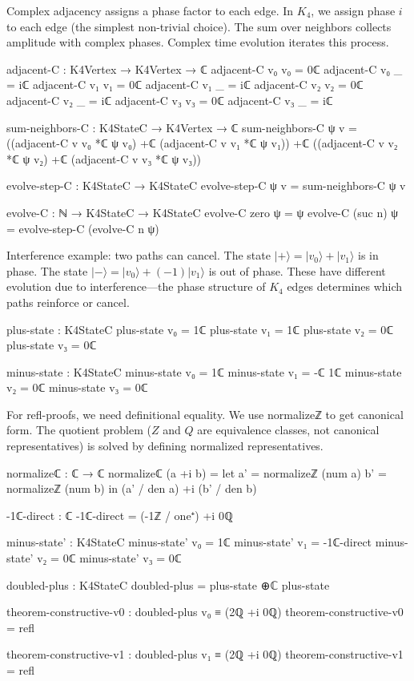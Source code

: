 \documentclass[11pt,a4paper]{book}
\def\mathbb#1{#1}%
\def\texttt#1{#1}%
\begin{document}
Complex adjacency assigns a phase factor to each edge. In $K_4$, we assign phase $i$ to each edge (the simplest non-trivial choice). The sum over neighbors collects amplitude with complex phases. Complex time evolution iterates this process.

\begin{code}
adjacent-C : K4Vertex → K4Vertex → ℂ
adjacent-C v₀ v₀ = 0ℂ
adjacent-C v₀ _  = iℂ
adjacent-C v₁ v₁ = 0ℂ
adjacent-C v₁ _  = iℂ
adjacent-C v₂ v₂ = 0ℂ
adjacent-C v₂ _  = iℂ
adjacent-C v₃ v₃ = 0ℂ
adjacent-C v₃ _  = iℂ

sum-neighbors-C : K4StateC → K4Vertex → ℂ
sum-neighbors-C ψ v = ((adjacent-C v v₀ *ℂ ψ v₀) +ℂ (adjacent-C v v₁ *ℂ ψ v₁))
                   +ℂ ((adjacent-C v v₂ *ℂ ψ v₂) +ℂ (adjacent-C v v₃ *ℂ ψ v₃))

evolve-step-C : K4StateC → K4StateC
evolve-step-C ψ v = sum-neighbors-C ψ v

evolve-C : ℕ → K4StateC → K4StateC
evolve-C zero ψ = ψ
evolve-C (suc n) ψ = evolve-step-C (evolve-C n ψ)
\end{code}

Interference example: two paths can cancel. The state $|+\rangle = |v_0\rangle + |v_1\rangle$ is in phase. The state $|-\rangle = |v_0\rangle + (-1)|v_1\rangle$ is out of phase. These have different evolution due to interference---the phase structure of $K_4$ edges determines which paths reinforce or cancel.

\begin{code}
plus-state : K4StateC
plus-state v₀ = 1ℂ
plus-state v₁ = 1ℂ
plus-state v₂ = 0ℂ
plus-state v₃ = 0ℂ

minus-state : K4StateC
minus-state v₀ = 1ℂ
minus-state v₁ = -ℂ 1ℂ
minus-state v₂ = 0ℂ
minus-state v₃ = 0ℂ
\end{code}

For refl-proofs, we need definitional equality. We use \texttt{normalizeℤ} to get canonical form. The quotient problem ($\mathbb{Z}$ and $\mathbb{Q}$ are equivalence classes, not canonical representatives) is solved by defining normalized representatives.

\begin{code}
normalizeℂ : ℂ → ℂ
normalizeℂ (a +i b) = 
  let a' = normalizeℤ (num a)
      b' = normalizeℤ (num b)
  in (a' / den a) +i (b' / den b)

-1ℂ-direct : ℂ
-1ℂ-direct = (-1ℤ / one⁺) +i 0ℚ

minus-state' : K4StateC
minus-state' v₀ = 1ℂ
minus-state' v₁ = -1ℂ-direct
minus-state' v₂ = 0ℂ
minus-state' v₃ = 0ℂ

doubled-plus : K4StateC
doubled-plus = plus-state ⊕ℂ plus-state

theorem-constructive-v0 : doubled-plus v₀ ≡ (2ℚ +i 0ℚ)
theorem-constructive-v0 = refl

theorem-constructive-v1 : doubled-plus v₁ ≡ (2ℚ +i 0ℚ)
theorem-constructive-v1 = refl
\end{code}
\end{document}
